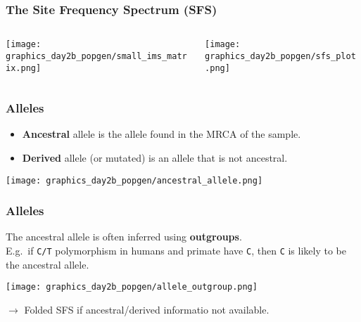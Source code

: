 \documentclass{beamer}
\newcommand{\1}{\ensuremath{\mathbf{1}}}
\begin{document}
\begin{frame}\frametitle{The Site Frequency Spectrum (SFS)}
	\begin{columns}
	\begin{column}{0.25\textwidth}
		\begin{center}
			\texttt{[image: graphics\_day2b\_popgen/small\_ims\_matrix.png]}
		\end{center}
	\end{column}
	\begin{column}{0.75\textwidth}
		\begin{center}
			\texttt{[image: graphics\_day2b\_popgen/sfs\_plot.png]}
		\end{center}
	\end{column}
	\end{columns}
\end{frame}
%
%
%
\begin{frame}\frametitle{Alleles}
	\begin{itemize}
		\item \textbf{Ancestral} allele is the allele found in the MRCA of the sample.
		\item \textbf{Derived} allele (or mutated) is an allele that is not ancestral.
	\end{itemize}
	\begin{center}
		\texttt{[image: graphics\_day2b\_popgen/ancestral\_allele.png]}
	\end{center}
\end{frame}
%
%
%
\begin{frame}\frametitle{Alleles}
	The ancestral allele is often inferred using \textbf{outgroups}.\\
	E.g.\ if \texttt{C/T} polymorphism in humans and primate have \texttt{C}, then \texttt{C} is likely to be the ancestral allele.
	\begin{center}
		\texttt{[image: graphics\_day2b\_popgen/allele\_outgroup.png]}
	\end{center}
	$\to$ Folded SFS if ancestral/derived informatio not available.
\end{frame}
\end{document}

